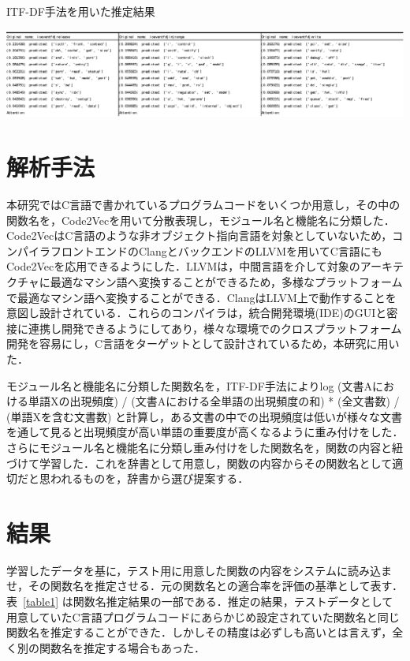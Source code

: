 \documentclass[submit,techrep,noauthor]{ipsj}
\begin{document}
\begin{table}[t]
 \centering
 \caption{ITF-DF手法を用いた推定結果}
 \includegraphics[width=1.0\hsize]{image/result.eps} 
 \label{table1} 
\end{table}


\section{解析手法}

本研究ではC言語で書かれているプログラムコードをいくつか用意し，その中の関数名を，Code2Vecを用いて分散表現し，モジュール名と機能名に分類した．Code2VecはC言語のような非オブジェクト指向言語を対象としていないため，コンパイラフロントエンドのClangとバックエンドのLLVMを用いてC言語にもCode2Vecを応用できるようにした．LLVMは，中間言語を介して対象のアーキテクチャに最適なマシン語へ変換することができるため，多様なプラットフォームで最適なマシン語へ変換することができる．ClangはLLVM上で動作することを意図し設計されている．これらのコンパイラは，統合開発環境(IDE)のGUIと密接に連携し開発できるようにしてあり，様々な環境でのクロスプラットフォーム開発を容易にし，C言語をターゲットとして設計されているため，本研究に用いた．

モジュール名と機能名に分類した関数名を，ITF-DF手法により{log (文書Aにおける単語Xの出現頻度) / (文書Aにおける全単語の出現頻度の和)} * {(全文書数) / (単語Xを含む文書数)} と計算し，ある文書の中での出現頻度は低いが様々な文書を通して見ると出現頻度が高い単語の重要度が高くなるように重み付けをした．さらにモジュール名と機能名に分類し重み付けをした関数名を，関数の内容と紐づけて学習した．これを辞書として用意し，関数の内容からその関数名として適切だと思われるものを，辞書から選び提案する．



\section{結果}
学習したデータを基に，テスト用に用意した関数の内容をシステムに読み込ませ，その関数名を推定させる．元の関数名との適合率を評価の基準として表す．
表~\ref{table1} は関数名推定結果の一部である．推定の結果，テストデータとして用意していたC言語プログラムコードにあらかじめ設定されていた関数名と同じ関数名を推定することができた．しかしその精度は必ずしも高いとは言えず，全く別の関数名を推定する場合もあった．
\end{document}
